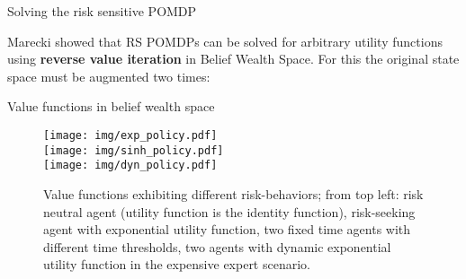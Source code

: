 
\large{Solving the risk sensitive POMDP}

\normalsize
Marecki \cite{marecki} showed that RS POMDPs can be solved for arbitrary utility functions using \textbf{reverse value iteration} in Belief Wealth Space.
For this the original state space must be augmented two times:

\begin{figure}
\begin {center}
\end{center}
\end{figure}

\hspace{2cm}

\large{Value functions in belief wealth space}


\normalsize

\begin{figure}
    \texttt{[image: img/exp\_policy.pdf]}\\
    \texttt{[image: img/sinh\_policy.pdf]}\\
    \texttt{[image: img/dyn\_policy.pdf]}
    \caption{Value functions exhibiting different risk-behaviors; from top left: risk neutral agent (utility function is the identity function), risk-seeking agent with exponential utility function, two fixed time agents with different time thresholds, two agents with dynamic exponential utility function in the expensive expert scenario.}
\end{figure}

